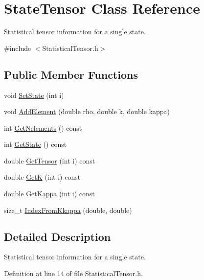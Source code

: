 \hypertarget{classStateTensor}{\section{State\-Tensor Class Reference}
\label{classStateTensor}
}


Statistical tensor information for a single state.  




{\ttfamily \#include $<$Statistical\-Tensor.\-h$>$}

\subsection*{Public Member Functions}
\begin{DoxyCompactItemize}
\item 
void \hyperlink{classStateTensor_a969a220f6a5be9b01afa78b6292e01d7}{Set\-State} (int i)
\item 
void \hyperlink{classStateTensor_a830dc885eb4aa28cd39c144f07c2ec06}{Add\-Element} (double rho, double k, double kappa)
\item 
int \hyperlink{classStateTensor_ad297f8b055e24255c184e1aa3cba9813}{Get\-Nelements} () const 
\item 
int \hyperlink{classStateTensor_a007e86a82445e082bc1b183805990039}{Get\-State} () const 
\item 
double \hyperlink{classStateTensor_a5e6589749f471fab682594e8df6c7da7}{Get\-Tensor} (int i) const 
\item 
double \hyperlink{classStateTensor_adbef5f333e1f020354f400c6e70c510f}{Get\-K} (int i) const 
\item 
double \hyperlink{classStateTensor_a596ba29aacb7231b5d9cef84071115de}{Get\-Kappa} (int i) const 
\item 
size\-\_\-t \hyperlink{classStateTensor_a10cd06b8aadf80ee0041f198bf1bbde4}{Index\-From\-Kkappa} (double, double)
\end{DoxyCompactItemize}


\subsection{Detailed Description}
Statistical tensor information for a single state. 

Definition at line 14 of file Statistical\-Tensor.\-h.



